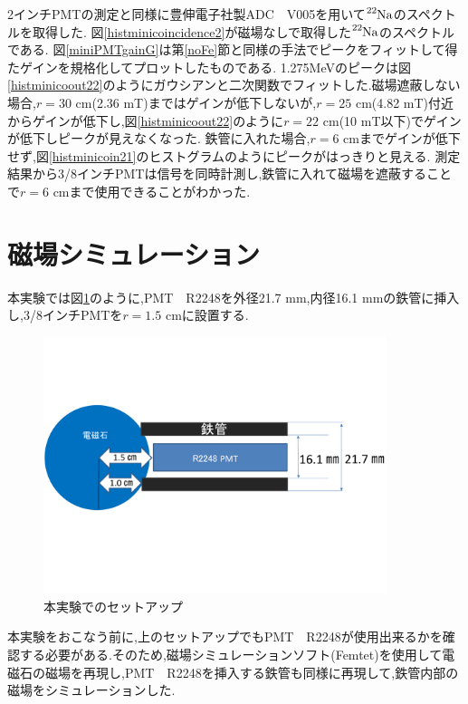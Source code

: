 2インチPMTの測定と同様に豊伸電子社製ADC　V005を用いて$\ce{^{22}Na}$のスペクトルを取得した.
図\ref{histminicoincidence2}が磁場なしで取得した$\ce{^{22}Na}$のスペクトルである.
図\ref{miniPMTgainG}は第\ref{noFe}節と同様の手法でピークをフィットして得たゲインを規格化してプロットしたものである.
1.275MeVのピークは図\ref{histminicoout22}のようにガウシアンと二次関数でフィットした.磁場遮蔽しない場合,$r=30$ cm(2.36 mT)まではゲインが低下しないが,$r=25$ cm(4.82 mT)付近からゲインが低下し,図\ref{histminicoout22}のように$r=22$ cm(10 mT以下)でゲインが低下しピークが見えなくなった.
鉄管に入れた場合,$r=6$ cmまでゲインが低下せず,図\ref{histminicoin21}のヒストグラムのようにピークがはっきりと見える.
測定結果から3/8インチPMTは信号を同時計測し,鉄管に入れて磁場を遮蔽することで$r=6$ cmまで使用できることがわかった.

\section{磁場シミュレーション}
本実験では図\ref{honjikken}のように,PMT　R2248を外径21.7 mm,内径16.1 mmの鉄管に挿入し,3/8インチPMTを$r=1.5$ cmに設置する.

\begin{figure}[tbp]
	\centering
		\includegraphics[width=10cm]{fig/iguchi/honjikken.pdf}
	\caption{本実験でのセットアップ}
	\label{honjikken}
\end{figure}

本実験をおこなう前に,上のセットアップでもPMT　R2248が使用出来るかを確認する必要がある.そのため,磁場シミュレーションソフト(Femtet)を使用して電磁石の磁場を再現し,PMT　R2248を挿入する鉄管も同様に再現して,鉄管内部の磁場をシミュレーションした.

